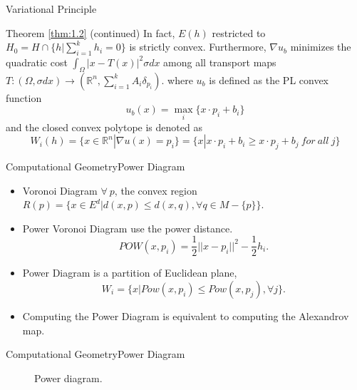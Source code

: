 \documentclass{beamer}
\theoremstyle{definition}
\begin{document}
\begin{frame}{Variational Principle}
\begin{block}{Theorem \ref{thm:1.2}}
(continued) In fact, $E(h)$ restricted to $H_0=H\cap\{h|\sum^k_{i=1}h_i=0\}$ is strictly convex. Furthermore, $\nabla u_b$ minimizes the quadratic cost $\int_{\Omega}|x-T(x)|^2\sigma dx$ among all transport maps $T:(\Omega, \sigma dx)\rightarrow(\mathbb{R}^n,\sum^k_{i=1}A_i\delta_{p_i})$. where $u_b$ is defined as the PL convex function $$u_b(x)=\max_i\{x\cdot p_i+b_i\}$$
and the closed convex polytope is denoted as $$W_i(h)=\{x\in \mathbb{R}^n|\nabla u(x)=p_i\}=\{x|x\cdot p_i+b_i\geq x\cdot p_j+b_j\ for\ all\ j\}$$
\end{block}
\end{frame}

\begin{frame}{Computational Geometry}{Power Diagram}
\begin{itemize}
\item Voronoi Diagram
$\forall\ p$, the convex region $R(p)=\{x\in E^d | d(x,p) \leq d(x,q), \forall q \in M-\{p\}\}.$
\item Power Voronoi Diagram use the power distance. $$POW(x,p_i)=\dfrac{1}{2}||x-p_i||^2-\dfrac{1}{2}h_i.$$
\item Power Diagram is a partition of Euclidean plane,
$$W_i=\{x|Pow(x,p_i)\leq Pow(x,p_j), \forall j\}.$$
\item Computing the Power Diagram is equivalent to computing the Alexandrov map.
\end{itemize}
\end{frame}

\begin{frame}{Computational Geometry}{Power Diagram}
\begin{figure}
\centering
{}
\caption{Power diagram.}
\label{fig:PowDia}
\end{figure}

\end{frame}
\end{document}
